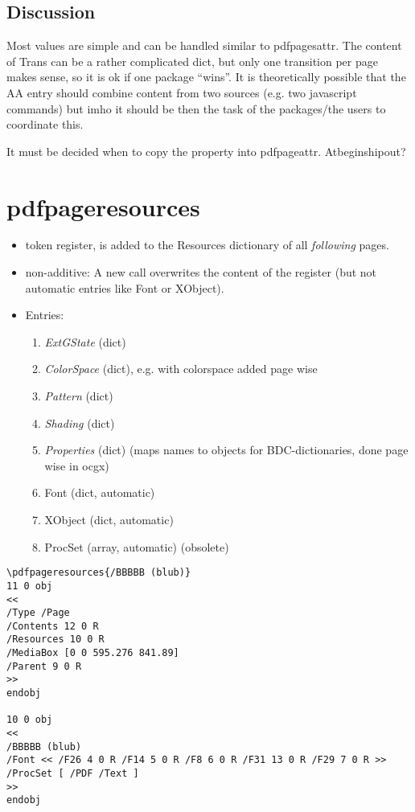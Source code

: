 \documentclass{article}
\begin{document}
\subsection{Discussion}

Most values are simple and can be handled similar to pdfpagesattr. The content of Trans can be a rather complicated dict, but only one transition per page makes sense, so it is ok if one package \enquote{wins}. It is theoretically possible that the AA entry should combine content from two sources (e.g. two javascript commands) but imho it should be then the task of the packages/the users to coordinate this.

It must be decided when to copy the property into pdfpageattr. Atbeginshipout?

\section{pdfpageresources}
\begin{itemize}
\item token register, is added to the Resources dictionary of all \emph{following} pages.
\item non-additive: A new call overwrites the content of the register (but not automatic entries like Font or XObject).
\item Entries:
 \begin{enumerate}
 \item \emph{ExtGState} (dict)
 \item \emph{ColorSpace} (dict), e.g. with colorspace added page wise
 \item \emph{Pattern} (dict)
 \item \emph{Shading} (dict)
 \item \emph{Properties} (dict) (maps names to objects for BDC-dictionaries, done page wise in ocgx)
 \item Font (dict, automatic)
 \item XObject (dict, automatic)
 \item ProcSet (array, automatic) (obsolete)
 \end{enumerate}

\end{itemize}
\begin{verbatim}
\pdfpageresources{/BBBBB (blub)}
11 0 obj
<<
/Type /Page
/Contents 12 0 R
/Resources 10 0 R
/MediaBox [0 0 595.276 841.89]
/Parent 9 0 R
>>
endobj

10 0 obj
<<
/BBBBB (blub)
/Font << /F26 4 0 R /F14 5 0 R /F8 6 0 R /F31 13 0 R /F29 7 0 R >>
/ProcSet [ /PDF /Text ]
>>
endobj
\end{verbatim}
\end{document}
